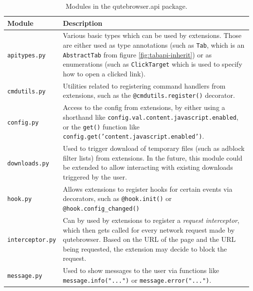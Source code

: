 \documentclass[a4paper,parskip=full,DIV=14,BCOR=15mm]{scrreprt}
\newcommand{\py}[1]{\texttt{#1}}
\begin{document}
\begin{table}[H]
  \centering
  \begin{tabulary}{\linewidth}{lL}
    \toprule
    Module & Description \\
    \midrule
    \verb|apitypes.py| & Various basic types which can be used by extensions.
                         Those are either used as type annotations (such as
                         \verb|Tab|, which is an \verb|AbstractTab| from figure
                         \ref{fig:tabapi-inherit}) or as enumerations (such as
                         \verb|ClickTarget| which is used to specify how to open
                         a clicked link). \\
    \verb|cmdutils.py| & Utilities related to registering command handlers from
                         extensions, such as the \py{@cmdutils.register()}
                         decorator. \\
    \verb|config.py| & Access to the config from extensions, by either using a
                       shorthand like
                       \verb|config.val.content.javascript.enabled|, or the
                       \verb|get()| function like
                       \py{config.get('content.javascript.enabled')}. \\
    \verb|downloads.py| & Used to trigger download of temporary files (such as
                          adblock filter lists) from extensions. In the future,
                          this module could be extended to allow interacting
                          with existing downloads triggered by the user. \\
    \verb|hook.py| & Allows extensions to register hooks for certain events via
                     decorators, such as \py{@hook.init()} or
                     \py{@hook.config_changed()} \\
    \verb|interceptor.py| & Can by used by extensions to register a
                            \emph{request interceptor}, which then gets called
                            for every network request made by qutebrowser. Based
                            on the URL of the page and the URL being requested,
                            the extension may decide to block the request. \\
    \verb|message.py| & Used to show messages to the user via functions like
                        \py{message.info("...")} or \py{message.error("...")}. \\
    \bottomrule
  \end{tabulary}
  \caption{Modules in the qutebrowser.api package.}
  \label{tab:apimodule}
\end{table}
\end{document}
